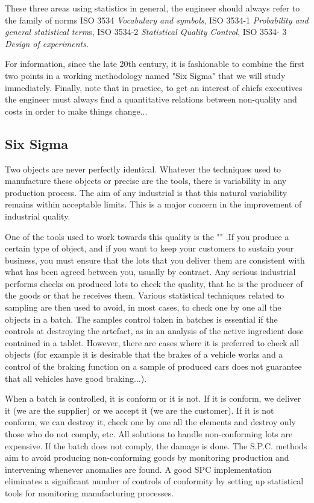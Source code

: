 These three areas using statistics in general, the engineer should always refer to the family of norms ISO 3534 \textit{Vocabulary and symbols}, ISO 3534-1 \textit{Probability and general statistical term}s, ISO 3534-2 \textit{Statistical Quality Control}, ISO 3534- 3 \textit{Design of experiments}.

For information, since the late 20th century, it is fashionable to combine the first two points in a working methodology named "Six Sigma" that we will study immediately. Finally, note that in practice, to get an interest of chiefs executives the engineer must always find a quantitative relations between non-quality and costs in order to make things change...

\subsection{Six Sigma}\label{six sigma}

Two objects are never perfectly identical. Whatever the techniques used to manufacture these objects or precise are the tools, there is variability in any production process. The aim of any industrial is that this natural variability remains within acceptable limits. This is a major concern in the improvement of industrial quality.

One of the tools used to work towards this quality is the "" .If you produce a certain type of object, and if you want to keep your customers to sustain your business, you must ensure that the lots that you deliver them are consistent with what has been agreed between you, usually by contract. Any serious  industrial performs checks on produced lots to check the quality, that he is the producer of the goods or that he receives them. Various statistical techniques related to sampling are then used to avoid, in most cases, to check one by one all the objects in a batch. The samples control  taken in batches is essential if the controls at destroying the artefact, as in an analysis of the active ingredient dose contained in a tablet. However, there are cases where it is preferred to check all objects (for example it is desirable that the brakes of a vehicle works and a control of the braking function on a sample of produced cars does not guarantee that all vehicles have good braking...).

When a batch is controlled, it is conform or it is not. If it is conform, we deliver it (we are the supplier) or we accept it (we are the customer). If it is not conform, we can destroy it, check one by one all the elements and destroy only those who do not comply, etc. All solutions to handle non-conforming lots are expensive. If the batch does not comply, the damage is done. The S.P.C. methods aim to avoid producing non-conforming goods by monitoring production and intervening whenever anomalies are found. A good SPC implementation eliminates a significant number of controls of conformity by setting up statistical tools for monitoring manufacturing processes.

